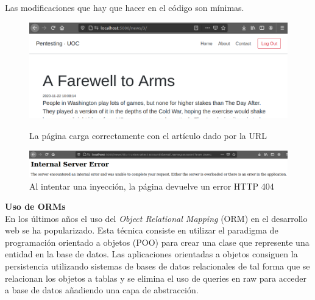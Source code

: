 \documentclass[a4paper,oneside]{article}
\begin{document}
\begin{enumerate}[label=\textbf{\alph*)}]
Las modificaciones que hay que hacer en el código son mínimas.





\begin{figure}[h!]
  \centering
  \includegraphics[scale=0.4]{images/alt_arch_ok.png}\\
  \caption{La página carga correctamente con el artículo dado por la URL}
  \label{fig:alt_arch}
\end{figure}

\begin{figure}[h!]
  \centering
  \includegraphics[scale=0.3]{images/nok.png}
  \caption{Al intentar una inyección, la página devuelve un error HTTP 404}
  \label{fig:alt_arch}
\end{figure}

\textbf{Uso de ORMs}\\
En los últimos años el uso del \textit{Object Relational Mapping} (ORM) en el desarrollo web se ha popularizado. Esta técnica consiste en utilizar el paradigma de programación orientado a objetos (POO) para crear una clase que represente una entidad en la base de datos. Las aplicaciones orientadas a objetos consiguen la persistencia utilizando sistemas de bases de datos relacionales de tal forma que se relacionan los objetos a tablas \cite{orm} y se elimina el uso de queries en raw para acceder a base de datos añadiendo una capa de abstracción.\\


\end{enumerate}
\end{document}
